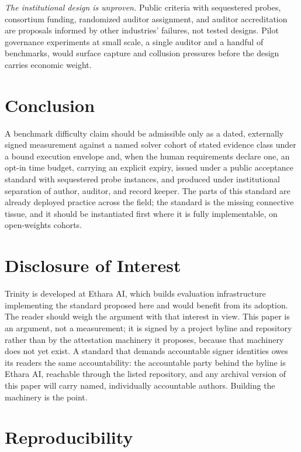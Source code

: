 \documentclass[11pt]{article}
\begin{document}
\emph{The institutional design is unproven.} Public criteria with sequestered probes, consortium funding, randomized auditor assignment, and auditor accreditation are proposals informed by other industries' failures, not tested designs. Pilot governance experiments at small scale, a single auditor and a handful of benchmarks, would surface capture and collusion pressures before the design carries economic weight.

\section{Conclusion}
\label{sec:conclusion}

A benchmark difficulty claim should be admissible only as a dated, externally signed measurement against a named solver cohort of stated evidence class under a bound execution envelope and, when the human requirements declare one, an opt-in time budget, carrying an explicit expiry, issued under a public acceptance standard with sequestered probe instances, and produced under institutional separation of author, auditor, and record keeper. The parts of this standard are already deployed practice across the field; the standard is the missing connective tissue, and it should be instantiated first where it is fully implementable, on open-weights cohorts.

\section*{Disclosure of Interest}

Trinity is developed at Ethara AI, which builds evaluation infrastructure implementing the standard proposed here and would benefit from its adoption. The reader should weigh the argument with that interest in view. This paper is an argument, not a measurement; it is signed by a project byline and repository rather than by the attestation machinery it proposes, because that machinery does not yet exist. A standard that demands accountable signer identities owes its readers the same accountability: the accountable party behind the byline is Ethara AI, reachable through the listed repository, and any archival version of this paper will carry named, individually accountable authors. Building the machinery is the point.

\appendix

\section{Reproducibility}
\end{document}
